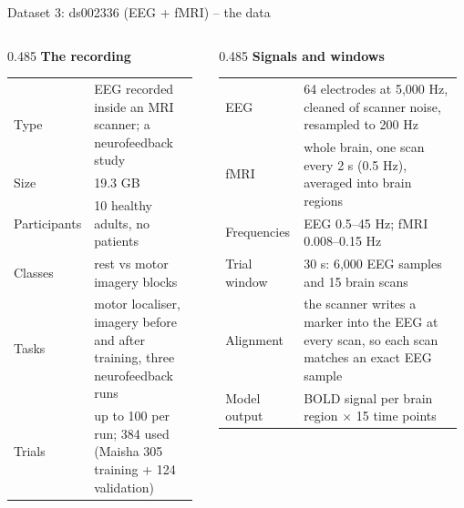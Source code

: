 \documentclass[aspectratio=169,11pt]{beamer}
\newcommand{\colhead}[1]{\textbf{#1}\par\vspace{2pt}}
\begin{document}
\begin{frame}{Dataset 3: ds002336 (EEG + fMRI) -- the data}
\begin{slidebox}
\scriptsize
\begin{columns}[T,onlytextwidth]
\begin{column}{0.485\textwidth}
\colhead{\small The recording}
\begin{tabular}{@{}p{0.3\linewidth}p{0.66\linewidth}@{}}
\toprule
Type & EEG recorded inside an MRI scanner; a neurofeedback study \\
Size & 19.3 GB \\
Participants & 10 healthy adults, no patients \\
Classes & rest vs motor imagery blocks \\
Tasks & motor localiser, imagery before and after training, three neurofeedback runs \\
Trials & up to 100 per run; 384 used (Maisha 305 training + 124 validation) \\
\bottomrule
\end{tabular}
\end{column}
\begin{column}{0.485\textwidth}
\colhead{\small Signals and windows}
\begin{tabular}{@{}p{0.3\linewidth}p{0.66\linewidth}@{}}
\toprule
EEG & 64 electrodes at 5,000 Hz, cleaned of scanner noise, resampled to 200 Hz \\
fMRI & whole brain, one scan every 2 s (0.5 Hz), averaged into brain regions \\
Frequencies & EEG 0.5--45 Hz; fMRI 0.008--0.15 Hz \\
Trial window & 30 s: 6,000 EEG samples and 15 brain scans \\
Alignment & the scanner writes a marker into the EEG at every scan, so each scan matches an exact EEG sample \\
Model output & BOLD signal per brain region $\times$ 15 time points \\
\bottomrule
\end{tabular}
\end{column}
\end{columns}
\end{slidebox}
\end{frame}
\end{document}

